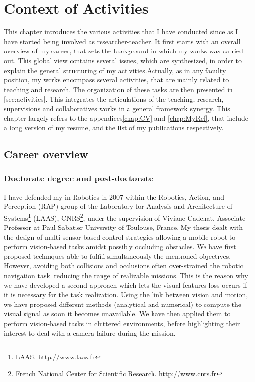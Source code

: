 
\chapter{Context of Activities}\label{chap:I}

This chapter introduces the various activities that I have conducted since as I have started being involved as researcher-teacher. 
It first starts with an overall overview of my career, that sets the background in which  my works was carried out.
This global  view contains several issues, which are synthesized, in order to explain the general structuring of my activities.Actually, as in any faculty position, my works encompass several activities, that are mainly related to teaching and research.
The organization of these tasks are then presented in \autoref{sec:activities}.
This integrates the articulations of the teaching, research, supervisions and collaboratives works in a general framework synergy.
This chapter largely refers to the appendices\;\ref{chap:CV} and \ref{chap:MyRef}, that include a long version of my resume, and the list of my publications respectively.


\section{Career overview}\label{sec:career}

\subsection{Doctorate degree and post-doctorate}\label{sec:career:PhD}

I have defended my \PhD in Robotics in 2007 within the  Robotics, Action, and Perception (RAP) group of the Laboratory for Analysis and Architecture of Systems\footnote{LAAS: \url{http://www.laas.fr}} (LAAS), CNRS\footnote{French National Center for Scientific Research. \url{http://www.cnrs.fr}}, under the supervision of Viviane Cadenat, Associate Professor at Paul Sabatier University of Toulouse, France. 
My \PhD thesis dealt with the design of multi-sensor based control strategies allowing a mobile robot to perform vision-based tasks amidst possibly occluding obstacles.
We have first proposed techniques able to fulfill simultaneously the mentioned objectives. 
However, avoiding both collisions and occlusions often over-strained the robotic navigation task, reducing the range of realizable missions. 
This is the reason why we have developed a second approach which lets the visual features loss occurs if it is necessary for the task realization. 
Using the link between vision and motion, we have proposed different methods (analytical and numerical) to compute the visual signal as soon it becomes unavailable. 
We have then applied them to perform vision-based tasks in cluttered environments, before highlighting their interest to deal with a camera failure during the mission.

